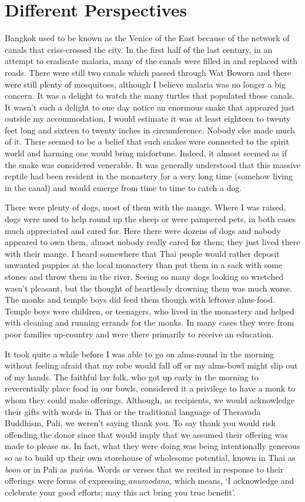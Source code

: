 \chapter{Different Perspectives}

Bangkok used to be known as the Venice of the East because of the
network of canals that criss-crossed the city. In the first half of the
last century, in an attempt to eradicate malaria, many of the canals
were filled in and replaced with roads. There were still two canals
which passed through Wat Boworn and there were still plenty of
mosquitoes, although I believe malaria was no longer a big concern. It
was a delight to watch the many turtles that populated those canals. It
wasn't such a delight to one day notice an enormous snake that appeared
just outside my accommodation. I would estimate it was at least eighteen
to twenty feet long and sixteen to twenty inches in circumference.
Nobody else made much of it. There seemed to be a belief that such
snakes were connected to the spirit world and harming one would bring
misfortune. Indeed, it almost seemed as if the snake was considered
venerable. It was generally understood that this massive reptile had
been resident in the monastery for a very long time (somehow living in
the canal) and would emerge from time to time to catch a dog.

There were plenty of dogs, most of them with the mange. Where I was
raised, dogs were used to help round up the sheep or were pampered pets,
in both cases much appreciated and cared for. Here there were dozens of
dogs and nobody appeared to own them, almost nobody really cared for
them; they just lived there with their mange. I heard somewhere that
Thai people would rather deposit unwanted puppies at the local monastery
than put them in a sack with some stones and throw them in the river.
Seeing so many dogs looking so wretched wasn't pleasant, but the thought
of heartlessly drowning them was much worse. The monks and temple boys
did feed them though with leftover alms-food. Temple boys were children,
or teenagers, who lived in the monastery and helped with cleaning and
running errands for the monks. In many cases they were from poor
families up-country and were there primarily to receive an education.

It took quite a while before I was able to go on alms-round in the
morning without feeling afraid that my robe would fall off or my
alms-bowl might slip out of my hands. The faithful lay folk, who got up
early in the morning to reverentially place food in our bowls,
considered it a privilege to have a monk to whom they could make
offerings. Although, as recipients, we would acknowledge their gifts
with words in Thai or the traditional language of Theravada Buddhism,
Pali, we weren't saying thank you. To say thank you would risk offending
the donor since that would imply that we assumed their offering was made
to please us. In fact, what they were doing was being intentionally
generous so as to build up their own storehouse of wholesome potential,
known in Thai as \emph{boon} or in Pali as \emph{puñña}. Words or verses
that we recited in response to their offerings were forms of expressing
\emph{anumodana,} which means, `I acknowledge and celebrate your good
efforts; may this act bring you true benefit'.

